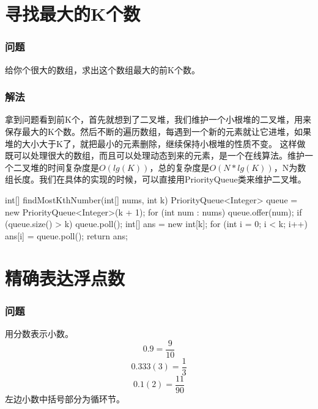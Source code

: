 \section{寻找最大的K个数} %
\label{sec:find-k-great-number}

\subsubsection{问题}
给你个很大的数组，求出这个数组最大的前K个数。

\subsubsection{解法}
拿到问题看到前K个，首先就想到了二叉堆，我们维护一个小根堆的二叉堆，用来保存最大的K个数。然后不断的遍历数组，每遇到一个新的元素就让它进堆，如果堆的大小大于K了，就把最小的元素删除，继续保持小根堆的性质不变。
这样做既可以处理很大的数组，而且可以处理动态到来的元素，是一个在线算法。维护一个二叉堆的时间复杂度是$O(lg(K))$，总的复杂度是$O(N*lg(K))$，N为数组长度。我们在具体的实现的时候，可以直接用PriorityQueue类来维护二叉堆。
\begin{Codex}[label={[$O(N*lg(K))+O(K)$]Chap02_05_FindKthNumber.java}]
	int[] findMostKthNumber(int[] nums, int k) {
		PriorityQueue<Integer> queue = new PriorityQueue<Integer>(k + 1);
		for (int num : nums) {
			queue.offer(num);
			if (queue.size() > k) {
				queue.poll();
			}
		}
		int[] ans = new int[k];
		for (int i = 0; i < k; i++) {
			ans[i] = queue.poll();
		}
		return ans;
	}
\end{Codex}


\section{精确表达浮点数} %
\label{sec:float-number}

\subsubsection{问题}
用分数表示小数。
\[ 0.9 = \frac{9}{10} \]
\[ 0.333(3) = \frac{1}{3} \]
\[ 0.1(2) = \frac{11}{90} \]
左边小数中括号部分为循环节。

